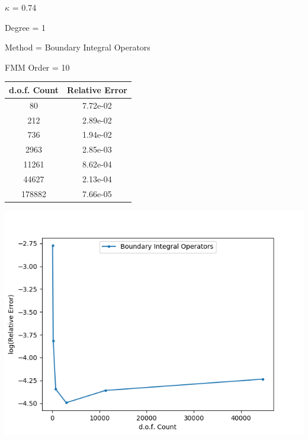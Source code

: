 \documentclass[uft8]{article}
\begin{document}
$\kappa$ = 0.74

Degree = 1

Method = Boundary Integral Operators

FMM Order = 10

\begin{longtable}{c c}
d.o.f. Count & Relative Error \\ \hline
80 & 7.72e-02 \\ \hline
212 & 2.89e-02 \\ \hline
736 & 1.94e-02 \\ \hline
2963 & 2.85e-03 \\ \hline
11261 & 8.62e-04 \\ \hline
44627 & 2.13e-04 \\ \hline
178882 & 7.66e-05 \\ \hline
\end{longtable}

\includegraphics[width=\textwidth]{fig--free--ongraph_method-coupling--req--x_ndof--y_rel_err.png}\\ 
\end{document}
